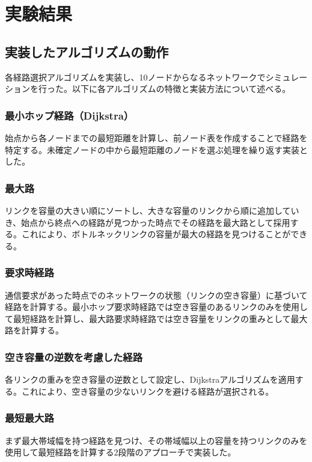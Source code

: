 \documentclass[a4paper,11pt]{jsarticle}
\begin{document}
\section{実験結果}

\subsection{実装したアルゴリズムの動作}
各経路選択アルゴリズムを実装し、10ノードからなるネットワークでシミュレーションを行った。以下に各アルゴリズムの特徴と実装方法について述べる。

\subsubsection{最小ホップ経路（Dijkstra）}
始点から各ノードまでの最短距離を計算し、前ノード表を作成することで経路を特定する。未確定ノードの中から最短距離のノードを選ぶ処理を繰り返す実装とした。

\subsubsection{最大路}
リンクを容量の大きい順にソートし、大きな容量のリンクから順に追加していき、始点から終点への経路が見つかった時点でその経路を最大路として採用する。これにより、ボトルネックリンクの容量が最大の経路を見つけることができる。

\subsubsection{要求時経路}
通信要求があった時点でのネットワークの状態（リンクの空き容量）に基づいて経路を計算する。最小ホップ要求時経路では空き容量のあるリンクのみを使用して最短経路を計算し、最大路要求時経路では空き容量をリンクの重みとして最大路を計算する。

\subsubsection{空き容量の逆数を考慮した経路}
各リンクの重みを空き容量の逆数として設定し、Dijkstraアルゴリズムを適用する。これにより、空き容量の少ないリンクを避ける経路が選択される。

\subsubsection{最短最大路}
まず最大帯域幅を持つ経路を見つけ、その帯域幅以上の容量を持つリンクのみを使用して最短経路を計算する2段階のアプローチで実装した。
\end{document}
